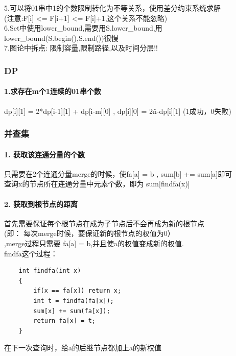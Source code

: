 \documentclass{article}
\begin{document}
5.可以将01串中1的个数限制转化为不等关系，使用差分约束系统求解 \\ (注意:F[i] <= F[i+1] <= F[i]+1,这个关系不能忽略) \\

6.Set中使用lower\_bound,需要用S.lower\_bound,用lower\_bound(S.begin(),S.end())很慢 \\

7.图论中拆点: 限制容量,限制路径,以及时间分层!!\\

\subsubsection{DP}
\paragraph{1.求存在m个1连续的01串个数\\}
  dp[i][1] = 2*dp[i-1][1] + dp[i-m][0] , dp[i][0] = 2\^n-dp[i][1] (1成功，0失败)\\
\subsubsection{并查集}
\paragraph{1. 获取该连通分量的个数\\}
只需要在2个连通分量merge的时候，使fa[a] = b , sum[b] += sum[a]即可\\
查询x的节点所在连通分量中元素个数，即为 sum[findfa(x)] \\

\paragraph{2. 获取到根节点的距离\\}
首先需要保证每个根节点在成为子节点后不会再成为新的根节点\\
(即： 每次merge时候，要保证新的根节点的权值为0） \\ ,merge过程只需要 fa[a] = b,并且使a的权值变成新的权值.\\
findfa这个过程：\\
\begin{lstlisting}
	int findfa(int x)
	{
		if(x == fa[x]) return x;
		int t = findfa(fa[x]);
		sum[x] += sum(fa[x]);
		return fa[x] = t;
	}
\end{lstlisting}
在下一次查询时，给a的后继节点都加上a的新权值\\
\end{document}
